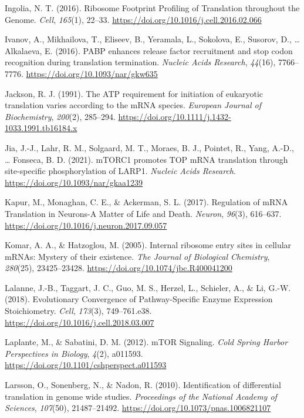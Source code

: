 \documentclass[12pt,openany]{book}
\begin{document}
\hypertarget{ref-Ingolia2016}{}
Ingolia, N. T. (2016). Ribosome Footprint Profiling of Translation
throughout the Genome. \emph{Cell}, \emph{165}(1), 22--33.
\url{https://doi.org/10.1016/j.cell.2016.02.066}

\hypertarget{ref-Ivanov2016}{}
Ivanov, A., Mikhailova, T., Eliseev, B., Yeramala, L., Sokolova, E.,
Susorov, D., \ldots{} Alkalaeva, E. (2016). PABP enhances release factor
recruitment and stop codon recognition during translation termination.
\emph{Nucleic Acids Research}, \emph{44}(16), 7766--7776.
\url{https://doi.org/10.1093/nar/gkw635}

\hypertarget{ref-Jackson1991}{}
Jackson, R. J. (1991). The ATP requirement for initiation of eukaryotic
translation varies according to the mRNA species. \emph{European Journal
of Biochemistry}, \emph{200}(2), 285--294.
\url{https://doi.org/10.1111/j.1432-1033.1991.tb16184.x}

\hypertarget{ref-Jia2021}{}
Jia, J.-J., Lahr, R. M., Solgaard, M. T., Moraes, B. J., Pointet, R.,
Yang, A.-D., \ldots{} Fonseca, B. D. (2021). mTORC1 promotes TOP mRNA
translation through site-specific phosphorylation of LARP1.
\emph{Nucleic Acids Research}.
\url{https://doi.org/10.1093/nar/gkaa1239}

\hypertarget{ref-Kapur2017}{}
Kapur, M., Monaghan, C. E., \& Ackerman, S. L. (2017). Regulation of
mRNA Translation in Neurons-A Matter of Life and Death. \emph{Neuron},
\emph{96}(3), 616--637.
\url{https://doi.org/10.1016/j.neuron.2017.09.057}

\hypertarget{ref-Komar2005}{}
Komar, A. A., \& Hatzoglou, M. (2005). Internal ribosome entry sites in
cellular mRNAs: Mystery of their existence. \emph{The Journal of
Biological Chemistry}, \emph{280}(25), 23425--23428.
\url{https://doi.org/10.1074/jbc.R400041200}

\hypertarget{ref-Lalanne2018}{}
Lalanne, J.-B., Taggart, J. C., Guo, M. S., Herzel, L., Schieler, A., \&
Li, G.-W. (2018). Evolutionary Convergence of Pathway-Specific Enzyme
Expression Stoichiometry. \emph{Cell}, \emph{173}(3), 749--761.e38.
\url{https://doi.org/10.1016/j.cell.2018.03.007}

\hypertarget{ref-Laplante2012}{}
Laplante, M., \& Sabatini, D. M. (2012). mTOR Signaling. \emph{Cold
Spring Harbor Perspectives in Biology}, \emph{4}(2), a011593.
\url{https://doi.org/10.1101/cshperspect.a011593}

\hypertarget{ref-Larsson2010}{}
Larsson, O., Sonenberg, N., \& Nadon, R. (2010). Identification of
differential translation in genome wide studies. \emph{Proceedings of
the National Academy of Sciences}, \emph{107}(50), 21487--21492.
\url{https://doi.org/10.1073/pnas.1006821107}
\end{document}
